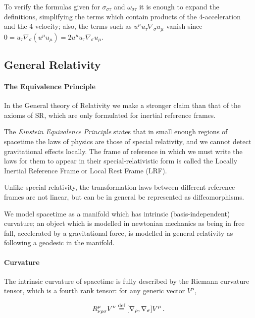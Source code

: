 \documentclass[main.tex]{subfiles}
\begin{document}
To verify the formulas given for \(\sigma_{\sigma \tau}\) and \(\omega_{\sigma \tau}\) it is enough to expand the definitions, simplifying the terms which contain products of the 4-acceleration and the 4-velocity; also, the terms such as \(u^\mu u_{\tau}\nabla_{\sigma} u_\mu \) vanish since \( 0= u_{\tau} \nabla_{\sigma} (u^\mu u_\mu) = 2 u^\mu u_{\tau}\nabla_{\sigma} u_\mu\).

\subsection{General Relativity}

\paragraph{The Equivalence Principle}

In the General theory of Relativity we make a stronger claim than that of the axioms of SR, which are only formulated for inertial reference frames.

The \emph{Einstein Equivalence Principle} states \cite[100]{Carroll:1997ar} that in small enough regions of spacetime the laws of physics are those of special relativity, and we cannot detect gravitational effects locally.
The frame of reference in which we must write the laws for them to appear in their special-relativistic form is called the Locally Inertial Reference Frame or Local Rest Frame (LRF).

Unlike special relativity, the transformation laws between different reference frames are not linear, but can be in general be represented as diffeomorphisms.

We model spacetime as a manifold which has intrinsic (basis-independent) curvature; an object which is modelled in newtonian mechanics as being in free fall, accelerated by a gravitational force, is modelled in general relativity as following a geodesic in the manifold.

\paragraph{Curvature} \label{par:curvature}

The intrinsic curvature of spacetime is fully described by the Riemann curvature tensor, which is a fourth rank tensor: for any generic vector \(V^\mu\),

\begin{equation} \label{eq:riemann-tensor-def}
    R ^{\mu} _{\nu \rho \sigma} V^\nu \stackrel{\text{def}}{=} [\nabla_\rho, \nabla_\sigma]   V^\mu \,.
\end{equation}
\end{document}
